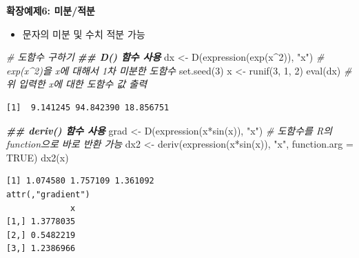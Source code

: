 \documentclass[
  11pt,
]{krantz}
\newenvironment{Shaded}{\begin{snugshade}}{\end{snugshade}}
\newcommand{\AttributeTok}[1]{\textcolor[rgb]{0.61,0.61,0.61}{#1}}
\newcommand{\CommentTok}[1]{\textcolor[rgb]{0.37,0.37,0.37}{\textit{#1}}}
\newcommand{\ConstantTok}[1]{\textcolor[rgb]{0,0,0}{#1}}
\newcommand{\DecValTok}[1]{\textcolor[rgb]{0.06,0.06,0.06}{#1}}
\newcommand{\DocumentationTok}[1]{\textcolor[rgb]{0.37,0.37,0.37}{\textbf{\textit{#1}}}}
\newcommand{\FunctionTok}[1]{\textcolor[rgb]{0,0,0}{#1}}
\newcommand{\NormalTok}[1]{#1}
\newcommand{\OtherTok}[1]{\textcolor[rgb]{0.37,0.37,0.37}{#1}}
\newcommand{\SpecialCharTok}[1]{\textcolor[rgb]{0,0,0}{#1}}
\newcommand{\StringTok}[1]{\textcolor[rgb]{0.5,0.5,0.5}{#1}}
\providecommand{\tightlist}{%
  \setlength{\itemsep}{0pt}\setlength{\parskip}{0pt}}
\begin{document}
\normalsize

\textbf{확장예제6: 미분/적분}

\begin{itemize}
\tightlist
\item
  문자의 미분 및 수치 적분 가능
\end{itemize}

\footnotesize

\begin{Shaded}
\begin{Highlighting}[]
\CommentTok{\# 도함수 구하기}
\DocumentationTok{\#\# D() 함수 사용}
\NormalTok{dx }\OtherTok{\textless{}{-}} \FunctionTok{D}\NormalTok{(}\FunctionTok{expression}\NormalTok{(}\FunctionTok{exp}\NormalTok{(x}\SpecialCharTok{\^{}}\DecValTok{2}\NormalTok{)), }\StringTok{"x"}\NormalTok{) }\CommentTok{\# exp(x\^{}2)을 x에 대해서 1차 미분한 도함수}
\FunctionTok{set.seed}\NormalTok{(}\DecValTok{3}\NormalTok{)}
\NormalTok{x }\OtherTok{\textless{}{-}} \FunctionTok{runif}\NormalTok{(}\DecValTok{3}\NormalTok{, }\DecValTok{1}\NormalTok{, }\DecValTok{2}\NormalTok{)}
\FunctionTok{eval}\NormalTok{(dx) }\CommentTok{\# 위 입력한 x에 대한 도함수 값 출력}
\end{Highlighting}
\end{Shaded}

\begin{verbatim}
[1]  9.141245 94.842390 18.856751
\end{verbatim}

\begin{Shaded}
\begin{Highlighting}[]
\DocumentationTok{\#\# deriv() 함수 사용}
\NormalTok{grad }\OtherTok{\textless{}{-}} \FunctionTok{D}\NormalTok{(}\FunctionTok{expression}\NormalTok{(x}\SpecialCharTok{*}\FunctionTok{sin}\NormalTok{(x)), }\StringTok{"x"}\NormalTok{)}
\CommentTok{\# 도함수를 R의 function으로 바로 반환 가능}
\NormalTok{dx2 }\OtherTok{\textless{}{-}} \FunctionTok{deriv}\NormalTok{(}\FunctionTok{expression}\NormalTok{(x}\SpecialCharTok{*}\FunctionTok{sin}\NormalTok{(x)), }\StringTok{"x"}\NormalTok{, }\AttributeTok{function.arg =} \ConstantTok{TRUE}\NormalTok{) }
\FunctionTok{dx2}\NormalTok{(x)}
\end{Highlighting}
\end{Shaded}

\begin{verbatim}
[1] 1.074580 1.757109 1.361092
attr(,"gradient")
             x
[1,] 1.3778035
[2,] 0.5482219
[3,] 1.2386966
\end{verbatim}
\end{document}
